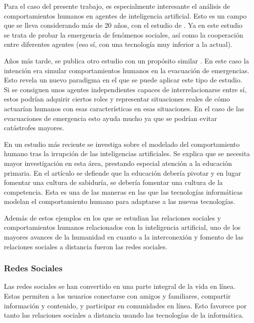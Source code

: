 Para el caso del presente trabajo, es especialmente interesante el análisis de comportamientos humanos en agentes de inteligencia artificial. Esto es un campo que se lleva considerando más de 20 años, con el estudio de \cite{CASTELFRANCHI1998157}. Ya en este estudio se trata de probar la emergencia de fenómenos sociales, así como la cooperación entre diferentes agentes (eso sí, con una tecnología muy inferior a la actual).

Años más tarde, se publica otro estudio con un propósito similar \citep{pan2007multi}. En este caso la intención era simular comportamientos humanos en la evacuación de emergencias. Esto revela un nuevo paradigma en el que se puede aplicar este tipo de estudio. Si se consiguen unos agentes independientes capaces de interrelacionarse entre sí, estos podrían adquirir ciertos roles y representar situaciones reales de cómo actuarían humanos con esas características en esas situaciones. En el caso de las evacuaciones de emergencia esto ayuda mucho ya que se podrían evitar catástrofes mayores.

En un estudio más reciente \citep{benvenuti2023artificial} se investiga sobre el modelado del comportamiento humano tras la irrupción de las inteligencias artificiales. Se explica que se necesita mayor investigación en esta área, prestando especial atención a la educación primaria. En el artículo se defiende que la educación debería pivotar y en lugar fomentar una cultura de sabiduría, se debería fomentar una cultura de la competencia. Esta es una de las maneras en las que las tecnologías informáticas modelan el comportamiento humano para adaptarse a las nuevas tecnologías.

Además de estos ejemplos en los que se estudian las relaciones sociales y comportamientos humanos relacionados con la inteligencia artificial, uno de los mayores avances de la humanidad en cuanto a la interconexión y fomento de las relaciones sociales a distancia fueron las redes sociales.

\subsubsection{Redes Sociales}

Las redes sociales se han convertido en una parte integral de la vida en línea. Estas permiten a los usuarios conectarse con amigos y familiares, compartir información y contenido, y participar en comunidades en línea. Esto favorece por tanto las relaciones sociales a distancia usando las tecnologías de la informática.


